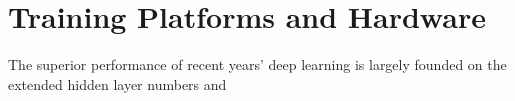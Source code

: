 \section{Training Platforms and Hardware}
The superior performance of recent years' deep learning is largely founded on the extended hidden layer numbers and  